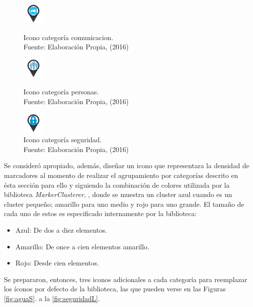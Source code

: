 \begin{figure}[!htb]
	\centering
	\captionsetup{justification=centering}
	\includegraphics[scale=1]{images/categorias/comunicacion.png}
	\caption[Icono categoría comunicacion.]{Icono categoría comunicacion.\\Fuente: Elaboración Propia, (2016)}
	\label{fig:comunicacion}	
	\endminipage\hfill
	\centering
	\captionsetup{justification=centering}
	\includegraphics[scale=1]{images/categorias/personas.png}
	\caption[Icono categoría personas.]{Icono categoría personas.\\Fuente: Elaboración Propia, (2016)}
	\label{fig:personas}
	\endminipage\hfill
	\centering
	\captionsetup{justification=centering}
	\includegraphics[scale=1]{images/categorias/seguridad.png}
	\caption[Icono categoría seguridad.]{Icono categoría seguridad.\\Fuente: Elaboración Propia, (2016)}
	\label{fig:seguridad}
	\endminipage\hfill
\end{figure}

Se consideró apropiado, además, diseñar un icono que representara la densidad de marcadores al momento de realizar el agrupamiento por categorías descrito en ésta sección para ello y siguiendo la combinación de colores utilizada por la biblioteca \textit{MarkerClusterer}, \cite{MarkerClusterer}, donde se muestra un cluster azul cuando es un cluster pequeño; amarillo para uno medio y rojo para uno grande. El tamaño de cada uno de estos es especificado internamente por la biblioteca:

\begin{itemize}
\item Azul: De dos a diez elementos.
\item Amarillo: De once a cien elementos amarillo.
\item Rojo: Desde cien elementos.
\end{itemize}

Se prepararon, entonces, tres iconos adicionales a cada categoría para reemplazar los íconos por defecto de la biblioteca, las que pueden verse en las Figuras \ref{fig:aguaS}. a la \ref{fig:seguridadL}.

